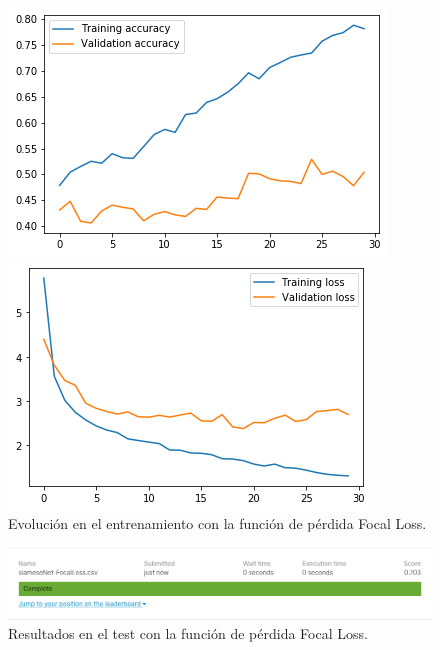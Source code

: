 \documentclass[11pt,a4paper]{article}
\begin{document}
\begin{figure}[H]
\centering
\begin{minipage}{0.5\textwidth}
  \centering
  \includegraphics[scale=0.5]{img/accuracy-focalloss.png}
\end{minipage}%
\begin{minipage}{0.5\textwidth}
  \centering
  \includegraphics[scale=0.5]{img/loss-focalloss.png}
\end{minipage}
\caption{Evolución en el entrenamiento con la función de pérdida Focal Loss.}
\label{fig:graph-focalloss}
\end{figure}

\begin{figure}[H]
    \centering
    \includegraphics[scale=0.55]{img/siameseNet-focalloss.png}
    \caption{Resultados en el test con la función de pérdida Focal Loss.}
    \label{fig:test-focalloss}
\end{figure}
\end{document}
